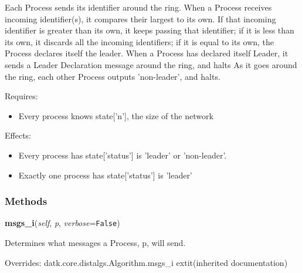 Each Process sends its identifier around the ring. When a Process receives 
incoming identifier(s), it compares their largest to its own. If that 
incoming identifier is greater than its own, it keeps passing that 
identifier; if it is less than its own, it discards all the incoming 
identifiers; if it is equal to its own, the Process declares itself the 
leader. When a Process has declared itself Leader, it sends a Leader 
Declaration message around the ring, and halts As it goes around the ring, 
each other Process outputs 'non-leader', and halts.

Requires:

\begin{itemize}
\setlength{\parskip}{0.6ex}
  \item Every process knows state['n'], the size of the network

\end{itemize}

Effects:

\begin{itemize}
\setlength{\parskip}{0.6ex}
  \item Every process has state['status'] is 'leader' or 'non-leader'.

  \item Exactly one process has state['status'] is 'leader'

\end{itemize}



  \subsubsection{Methods}

    \vspace{0.5ex}

\hspace{.8\funcindent}\begin{boxedminipage}{\funcwidth}

    \raggedright \textbf{msgs\_i}(\textit{self}, \textit{p}, \textit{verbose}={\tt False})

\setlength{\parskip}{2ex}
    Determines what messages a Process, p, will send.

\setlength{\parskip}{1ex}
      Overrides: datk.core.distalgs.Algorithm.msgs\_i 	extit{(inherited documentation)}

    \end{boxedminipage}

